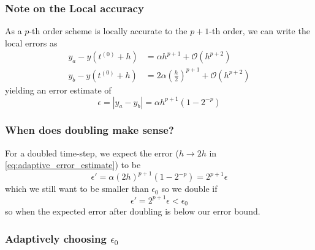 \subsubsection{Note on the Local accuracy}
As a $p$-th order scheme is locally accurate to the $p+1$-th order, we can write the local errors as
\begin{equation}
  \begin{aligned}
    y_a - y(t^{(0)} + h) &= \alpha h^{p+1} + \mathcal{O}(h^{p+2}) \\
    y_b - y(t^{(0)} + h) &= 2 \alpha \left( \frac{h}{2} \right)^{p+1} + \mathcal{O}(h^{p+2})
  \end{aligned}
\end{equation}
yielding an error estimate of
\begin{equation}
  \label{eq:adaptive_error_estimate}
  \epsilon = |y_a - y_b| = \alpha h^{p+1} (1 - 2^{-p})
\end{equation}

\subsubsection{When does doubling make sense?}
For a doubled time-step, we expect the error ($h\rightarrow 2h$ in \eqref{eq:adaptive_error_estimate}) to be
\begin{equation}
  \epsilon' = \alpha (2h)^{p+1} (1 - 2^{-p}) = 2^{p+1} \epsilon
\end{equation}
which we still want to be smaller than $\epsilon_0$ so we double if
\begin{equation}
  \epsilon' = 2^{p+1} \epsilon < \epsilon_0
\end{equation}
so when the expected error after doubling is below our error bound.

\subsubsection{Adaptively choosing $\epsilon_0$}

